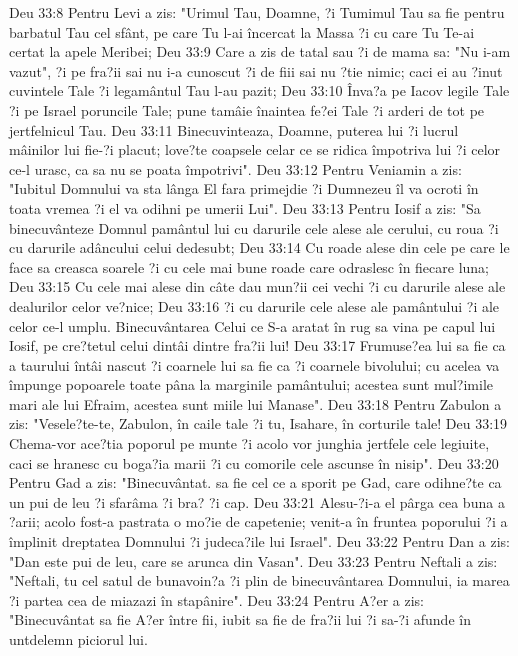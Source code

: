 Deu 33:8  Pentru Levi a zis: "Urimul Tau, Doamne, ?i Tumimul Tau sa fie pentru barbatul Tau cel sfânt, pe care Tu l-ai încercat la Massa ?i cu care Tu Te-ai certat la apele Meribei;
Deu 33:9  Care a zis de tatal sau ?i de mama sa: "Nu i-am vazut", ?i pe fra?ii sai nu i-a cunoscut ?i de fiii sai nu ?tie nimic; caci ei au ?inut cuvintele Tale ?i legamântul Tau l-au pazit;
Deu 33:10  Înva?a pe Iacov legile Tale ?i pe Israel poruncile Tale; pune tamâie înaintea fe?ei Tale ?i arderi de tot pe jertfelnicul Tau.
Deu 33:11  Binecuvinteaza, Doamne, puterea lui ?i lucrul mâinilor lui fie-?i placut; love?te coapsele celar ce se ridica împotriva lui ?i celor ce-l urasc, ca sa nu se poata împotrivi".
Deu 33:12  Pentru Veniamin a zis: "Iubitul Domnului va sta lânga El fara primejdie ?i Dumnezeu îl va ocroti în toata vremea ?i el va odihni pe umerii Lui".
Deu 33:13  Pentru Iosif a zis: "Sa binecuvânteze Domnul pamântul lui cu darurile cele alese ale cerului, cu roua ?i cu darurile adâncului celui dedesubt;
Deu 33:14  Cu roade alese din cele pe care le face sa creasca soarele ?i cu cele mai bune roade care odraslesc în fiecare luna;
Deu 33:15  Cu cele mai alese din câte dau mun?ii cei vechi ?i cu darurile alese ale dealurilor celor ve?nice;
Deu 33:16  ?i cu darurile cele alese ale pamântului ?i ale celor ce-l umplu. Binecuvântarea Celui ce S-a aratat în rug sa vina pe capul lui Iosif, pe cre?tetul celui dintâi dintre fra?ii lui!
Deu 33:17  Frumuse?ea lui sa fie ca a taurului întâi nascut ?i coarnele lui sa fie ca ?i coarnele bivolului; cu acelea va împunge popoarele toate pâna la marginile pamântului; acestea sunt mul?imile mari ale lui Efraim, acestea sunt miile lui Manase".
Deu 33:18  Pentru Zabulon a zis: "Vesele?te-te, Zabulon, în caile tale ?i tu, Isahare, în corturile tale!
Deu 33:19  Chema-vor ace?tia poporul pe munte ?i acolo vor junghia jertfele cele legiuite, caci se hranesc cu boga?ia marii ?i cu comorile cele ascunse în nisip".
Deu 33:20  Pentru Gad a zis: "Binecuvântat. sa fie cel ce a sporit pe Gad, care odihne?te ca un pui de leu ?i sfarâma ?i bra? ?i cap.
Deu 33:21  Alesu-?i-a el pârga cea buna a ?arii; acolo fost-a pastrata o mo?ie de capetenie; venit-a în fruntea poporului ?i a împlinit dreptatea Domnului ?i judeca?ile lui Israel".
Deu 33:22  Pentru Dan a zis: "Dan este pui de leu, care se arunca din Vasan".
Deu 33:23  Pentru Neftali a zis: "Neftali, tu cel satul de bunavoin?a ?i plin de binecuvântarea Domnului, ia marea ?i partea cea de miazazi în stapânire".
Deu 33:24  Pentru A?er a zis: "Binecuvântat sa fie A?er între fii, iubit sa fie de fra?ii lui ?i sa-?i afunde în untdelemn piciorul lui.

